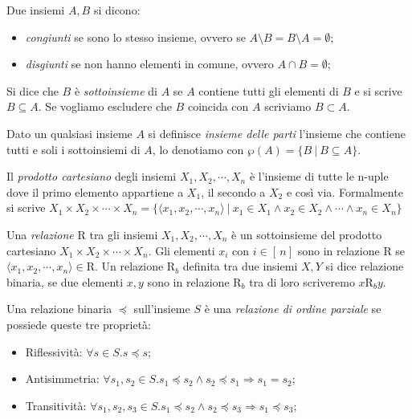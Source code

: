 \begin{definition}
Due insiemi \(A, B\) si dicono:
\begin{itemize}
    \item \textit{congiunti} se sono lo stesso insieme, ovvero se \(A\setminus B=B\setminus A=\emptyset\);
    \item \textit{disgiunti}  se non hanno elementi in comune, ovvero \(A\cap B=\emptyset\);
\end{itemize}
Si dice che \(B\) è \textit{sottoinsieme} di \(A\) se \(A\) contiene tutti gli elementi di \(B\) e si scrive \(B\subseteq A\). Se vogliamo escludere che \(B\) coincida con \(A\) scriviamo \(B\subset A\). 
\end{definition}

\begin{definition}
Dato un qualsiasi insieme \(A\) si definisce \textit{insieme delle parti} l'insieme che contiene tutti e soli i sottoinsiemi di \(A\), lo denotiamo con \(\wp(A)=\{B\ |\ B\subseteq A\}\).
\end{definition}

\begin{definition}
Il \textit{prodotto cartesiano} degli insiemi \(X_1,X_2,\cdots,X_n\) è l'insieme di tutte le n-uple dove il primo elemento appartiene a \(X_1\), il secondo a \(X_2\) e così via. Formalmente si scrive \(X_1\times X_2\times\cdots\times X_n=\{\langle x_1, x_2,\cdots, x_n\rangle\ |\ x_1\in X_1\wedge x_2\in X_2\wedge\cdots\wedge x_n\in X_n\}\)
\end{definition}

\begin{definition}[Relazione]
Una \textit{relazione} R tra gli insiemi \(X_1,X_2,\cdots,X_n\) è un sottoinsieme del prodotto cartesiano \(X_1\times X_2\times\cdots\times X_n\). Gli elementi \(x_i\) con \(i\in [\, n]\) sono in relazione R se \(\langle x_1, x_2,\cdots, x_n\rangle\in\textrm{R}\). Un relazione \(\textrm{R}_b\) definita tra due insiemi \(X, Y\) si dice relazione binaria, se due elementi \(x, y\) sono in relazione \(\textrm{R}_b\) tra di loro scriveremo \(x\textrm{R}_b y\).
\end{definition}

\begin{definition}
Una relazione binaria \(\preceq\) sull'insieme \(S\) è una \textit{relazione di ordine parziale} se possiede queste tre proprietà:
\begin{itemize}
\item Riflessività: \(\forall s\in S. s\preceq s\);
\item Antisimmetria: \(\forall s_1, s_2\in S. s_1\preceq s_2 \wedge s_2\preceq s_1 \Rightarrow s_1=s_2\);
\item Transitività: \(\forall s_1, s_2, s_3 \in S. s_1\preceq s_2 \wedge s_2\preceq s_3 \Rightarrow s_1\preceq s_3\);
\end{itemize}
\end{definition}

